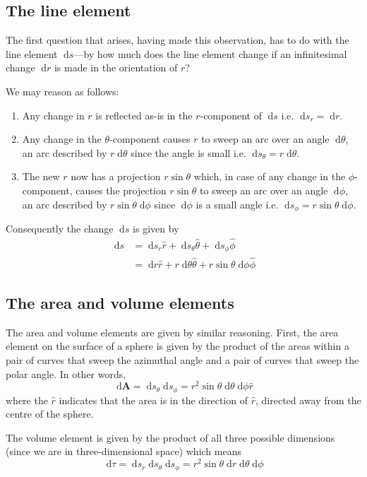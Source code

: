 \documentclass[english,seminar]{lecture}
\newcommand{\diff}{\;\textrm{d}}
\begin{document}
\subsection{The line element}
The first question that arises, having made this observation, has to do with the line element $\diff s$---by how much does the line element change if an infinitesimal change $\diff r$ is made in the orientation of $r$?

We may reason as follows:
\begin{enumerate}
	\item Any change in $r$ is reflected as-is in the $r$-component of $\diff s$ i.e. $\diff s_r = \diff r$.
	\item Any change in the $\theta$-component causes $r$ to sweep an arc over an angle $\diff \theta$, an arc described by $r\diff \theta$ since the angle is small i.e. $\diff s_\theta = r\diff \theta$.
	\item The new $r$ now has a projection $r\sin\theta$ which, in case of any change in the $\phi$-component, causes the projection $r\sin\theta$ to sweep an arc over an angle $\diff \phi$, an arc described by $r\sin\theta\diff \phi$ since $\diff \phi$ is a small angle i.e. $\diff s_\phi = r\sin\theta\diff\phi$.
\end{enumerate}
Consequently the change $\diff s$ is given by
\begin{align*}
\diff s &= \diff s_r\hat{r} + \diff s_\theta \hat{\theta} + \diff s_\phi \hat{\phi} \\
&= \diff r\hat{r} + r\diff\theta	\hat{\theta} + r\sin\theta\diff\phi \hat{\phi}
\end{align*}

\subsection{The area and volume elements}
The area and volume elements are given by similar reasoning. First, the area element on the surface of a sphere is given by the product of the areas within a pair of curves that sweep the azimuthal angle and a pair of curves that sweep the polar angle. In other words,
\[
\diff \mathbf{A} = \diff s_\theta \diff s_\phi = r^2\sin\theta\diff\theta\diff\phi \hat{r}
\]
where the $\hat{r}$ indicates that the area is in the direction of $\hat{r}$, directed away from the centre of the sphere.

The volume element is given by the product of all three possible dimensions (since we are in three-dimensional space) which means
\[
\diff \tau = \diff s_r \diff s_\theta \diff s_\phi = r^2\sin\theta\diff r\diff\theta\diff\phi
\]
\end{document}
